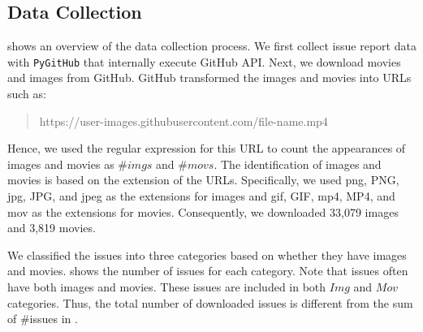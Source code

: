 \subsection{Data Collection}
 shows an overview of 
the data collection process. 
We first collect issue report data with \texttt{PyGitHub} 
that internally execute GitHub API. 
Next, we download movies and images from GitHub.
GitHub transformed the images and movies into URLs such as:
\begin{quote}
	https://user-images.githubusercontent.com/file-name.mp4
	\\
\end{quote}
Hence, we used the regular expression for this URL
to
count the appearances of images and movies as $\#imgs$ and $\#movs$. 
The identification of images and movies is based on the extension of 
the URLs. 
Specifically, we used png, PNG, jpg, JPG, and jpeg as 
the extensions for images and 
gif, GIF, mp4, MP4, and mov as the extensions for movies.
Consequently, we downloaded 33,079 images and 3,819 movies. 

We classified the issues into three categories based on 
whether they have images and movies. 
 shows the number of issues for each category. 
Note that issues often have both images and movies. 
These issues are included in both $Img$ and $Mov$ categories. 
Thus, the total number of downloaded issues is different from 
the sum of \#issues in . 



% 

